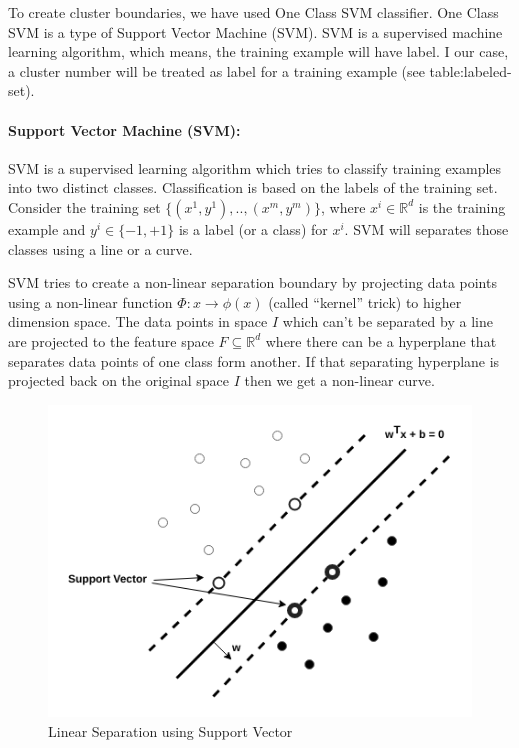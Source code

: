 \documentclass[12pt,oneside,a4paper]{article}
\begin{document}
To create cluster boundaries, we have used One Class SVM classifier. One Class SVM is a type of Support Vector Machine (SVM). SVM is a supervised machine learning algorithm, which means, the training example will have label. I our case, a cluster number will be treated as label for a training example (see table:labeled-set).

\paragraph{Support Vector Machine (SVM):}

SVM is a supervised learning algorithm which tries to classify training examples into two distinct classes. Classification is based on the labels of the training set.
Consider the training set $\{(x^{1},y^{1}), .., (x^{m},y^{m})\}$, where $x^{i} \in \mathbb{R}^d$ is the training example and $y^{i} \in \{-1, +1\}$ is a label (or a class) for $x^{i}$. SVM will separates those classes using a line or a curve.

SVM tries to create a non-linear separation boundary by projecting data points using a non-linear function $\Phi:x \rightarrow \phi(x)$ (called ``kernel'' trick) to higher dimension space. The data points in space $I$ which can't be separated by a line are projected to the feature space $F \subseteq \mathbb{R}^d$ where there can be a hyperplane that separates data points of one class form another. If that separating hyperplane is projected back on the original space $I$ then we get a non-linear curve.\cite{svm}

\begin{figure}[H]
\centering
\includegraphics[scale=0.5]{SVM.png}
\caption{Linear Separation using Support Vector} \label{fig:SVM}
\end{figure}
\end{document}
